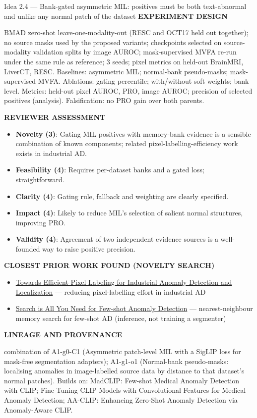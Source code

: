 \documentclass[11pt,a4paper]{article}
\newcommand{\lbl}[1]{{\sffamily\footnotesize\bfseries\color{muted}\MakeUppercase{#1}}\par}
\begin{document}
\begin{ideabox}{Idea 2.4 — Bank-gated asymmetric MIL: positives must be both text-abnormal and unlike any normal patch of the dataset}
\lbl{Experiment design}BMAD zero-shot leave-one-modality-out (RESC and OCT17 held out together); no source masks used by the proposed variants; checkpoints selected on source-modality validation splits by image AUROC; mask-supervised MVFA re-run under the same rule as reference; 3 seeds; pixel metrics on held-out BrainMRI, LiverCT, RESC. Baselines: asymmetric MIL; normal-bank pseudo-masks; mask-supervised MVFA. Ablations: gating percentile; with/without soft weights; bank level. Metrics: held-out pixel AUROC, PRO, image AUROC; precision of selected positives (analysis). Falsification: no PRO gain over both parents.

\lbl{Reviewer assessment}\begin{itemize}[leftmargin=1.2em,itemsep=1pt,topsep=2pt]
\item \textbf{Novelty (3)}: Gating MIL positives with memory-bank evidence is a sensible combination of known components; related pixel-labelling-efficiency work exists in industrial AD.
\item \textbf{Feasibility (4)}: Requires per-dataset banks and a gated loss; straightforward.
\item \textbf{Clarity (4)}: Gating rule, fallback and weighting are clearly specified.
\item \textbf{Impact (4)}: Likely to reduce MIL's selection of salient normal structures, improving PRO.
\item \textbf{Validity (4)}: Agreement of two independent evidence sources is a well-founded way to raise positive precision.
\end{itemize}
\lbl{Closest prior work found (novelty search)}\begin{itemize}[leftmargin=1.2em,itemsep=1pt,topsep=2pt]
\item \href{https://arxiv.org/pdf/2407.03130}{Towards Efficient Pixel Labeling for Industrial Anomaly Detection and Localization} — reducing pixel-labelling effort in industrial AD
\item \href{https://arxiv.org/pdf/2504.11895}{Search is All You Need for Few-shot Anomaly Detection} — nearest-neighbour memory search for few-shot AD (inference, not training a segmenter)
\end{itemize}
\lbl{Lineage and provenance}{\small combination of A1-g0-C1 (Asymmetric patch-level MIL with a SigLIP loss for mask-free segmentation adapters); A1-g1-o1 (Normal-bank pseudo-masks: localising anomalies in image-labelled source data by distance to that dataset's normal patches). Builds on: MadCLIP: Few-shot Medical Anomaly Detection with CLIP; Fine-Tuning CLIP Models with Convolutional Features for Medical Anomaly Detection; AA-CLIP: Enhancing Zero-Shot Anomaly Detection via Anomaly-Aware CLIP.}
\end{ideabox}
\end{document}
